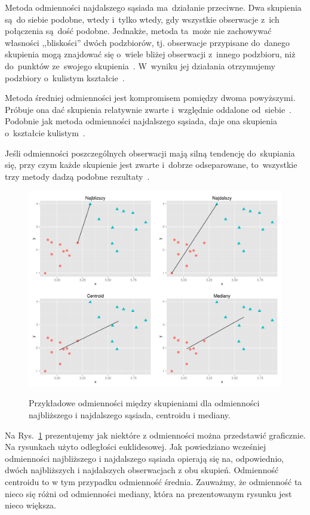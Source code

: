 \documentclass{praca1}
\begin{document}
Metoda odmienności najdalszego sąsiada ma~działanie przeciwne. Dwa skupienia są~do siebie podobne, wtedy i~tylko wtedy, gdy wszystkie obserwacje z~ich połączenia są~dość podobne. Jednakże, metoda ta~może nie zachowywać własności ,,bliskości'' dwóch podzbiorów, tj. obserwacje przypisane do~danego skupienia mogą znajdować się o~wiele bliżej obserwacji z~innego podzbioru, niż do~punktów ze~swojego skupienia~\cite{Hastie2009:elements}. W~wyniku jej działania otrzymujemy podzbiory o~kulistym kształcie~\cite{Koronacki2005:statystyczne}.

Metoda średniej odmienności jest kompromisem pomiędzy dwoma powyższymi. Próbuje ona dać skupienia relatywnie zwarte i~względnie oddalone od~siebie~\cite{Hastie2009:elements}. Podobnie jak metoda odmienności najdalszego sąsiada, daje ona skupienia o~kształcie kulistym~\cite{Koronacki2005:statystyczne}.

Jeśli odmienności poszczególnych obserwacji mają silną tendencję do~skupiania się, przy czym każde skupienie jest zwarte i~dobrze odseparowane, to~wszystkie trzy metody dadzą podobne rezultaty~\cite{Hastie2009:elements}.

\begin{figure}[!h]
  \centering
  \includegraphics[width=400pt]{plot32.pdf}\\
  \caption{Przykładowe odmienności między skupieniami dla odmienności najbliższego i najdalszego sąsiada, centroidu i mediany.}\label{plot:008}
\end{figure}

Na Rys.~\ref{plot:008} prezentujemy jak niektóre z odmienności można przedstawić graficznie. Na rysunkach użyto odległości euklidesowej. Jak powiedziano wcześniej odmienności najbliższego i najdalszego sąsiada opierają się na, odpowiednio, dwóch najbliższych i najdalszych obserwacjach z obu skupień. Odmienność centroidu to w tym przypadku odmienność średnia. Zauważmy, że odmienność ta nieco się różni od odmienności mediany, która na prezentowanym rysunku jest nieco większa.
\end{document}
